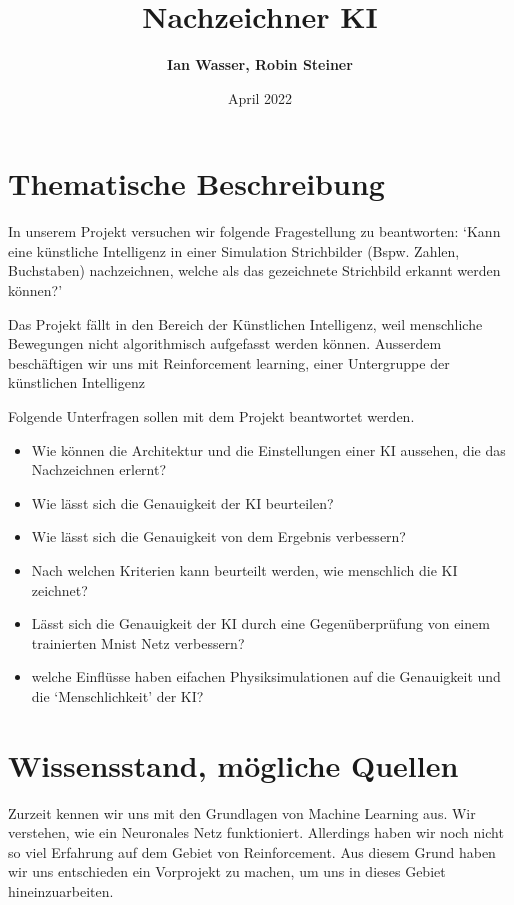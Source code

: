 \documentclass{article}
\title{\textbf{Nachzeichner KI}}
\author{\textbf{Ian Wasser, Robin Steiner}}
\date{April 2022}
\begin{document}
\maketitle

\tableofcontents

\pagebreak

\section{Thematische Beschreibung}
\label{chap:thematische-beschreibung}
In unserem Projekt versuchen wir folgende Fragestellung zu beantworten: `Kann
eine künstliche Intelligenz in einer Simulation Strichbilder (Bspw. Zahlen,
Buchstaben) nachzeichnen, welche als das gezeichnete Strichbild erkannt werden können?'

Das Projekt fällt in den Bereich der Künstlichen Intelligenz, weil menschliche
Bewegungen nicht algorithmisch aufgefasst werden können. Ausserdem beschäftigen
wir uns mit Reinforcement learning, einer Untergruppe der künstlichen
Intelligenz

Folgende Unterfragen sollen mit dem Projekt beantwortet werden.

\begin{itemize}
    \item Wie können die Architektur und die Einstellungen einer KI aussehen, die das Nachzeichnen erlernt?
    \item Wie lässt sich die Genauigkeit der KI beurteilen?
    \item Wie lässt sich die Genauigkeit von dem Ergebnis verbessern?
    \item Nach welchen Kriterien kann beurteilt werden, wie menschlich die KI zeichnet?
    \item Lässt sich die Genauigkeit der KI durch eine Gegenüberprüfung von einem trainierten Mnist Netz verbessern?
    \item welche Einflüsse haben eifachen Physiksimulationen auf die Genauigkeit und die `Menschlichkeit' der KI?
    

\end{itemize}

\section{Wissensstand, mögliche Quellen}
\label{chap:wissensstand}

Zurzeit kennen wir uns mit den Grundlagen von Machine Learning aus. Wir
verstehen, wie ein Neuronales Netz funktioniert. Allerdings haben wir noch nicht
so viel Erfahrung auf dem Gebiet von Reinforcement. Aus diesem Grund haben wir
uns entschieden ein Vorprojekt zu machen, um uns in dieses Gebiet
hineinzuarbeiten.
\end{document}
